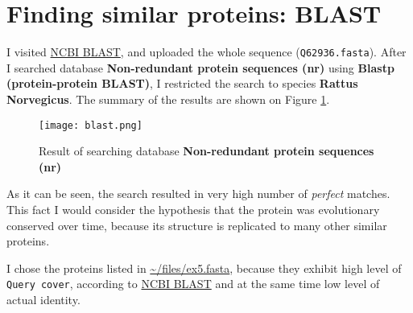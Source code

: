 \section{Finding similar proteins: BLAST}

I visited \href{https://blast.ncbi.nlm.nih.gov/Blast.cgi?PAGE=Proteins&PROGRAM=blastp&BLAST_PROGRAMS=blastp&PAGE_TYPE=BlastSearch&BLAST_SPEC=blast2seq&DATABASE=n/a&QUERY=&SUBJECTS=}{NCBI BLAST}, and uploaded the whole sequence (\texttt{Q62936.fasta}). After I searched database \textbf{Non-redundant protein sequences (nr)} using \textbf{Blastp (protein-protein BLAST)}, I restricted the search to species \textbf{Rattus Norvegicus}. The summary of the results are shown on Figure \ref{blastsum}.

\begin{figure}
\centering
\texttt{[image: blast.png]}
\caption{Result of searching database \textbf{Non-redundant protein sequences (nr)}}
\label{blastsum}
\end{figure}

As it can be seen, the search resulted in very high number of \emph{perfect} matches. This fact I would consider the hypothesis that the protein was evolutionary conserved over time, because its structure is replicated to many other similar proteins.

I chose the proteins listed in \url{~/files/ex5.fasta}, because they exhibit high level of \texttt{Query cover}, according to \href{https://blast.ncbi.nlm.nih.gov/Blast.cgi}{NCBI BLAST} and at the same time low level of actual identity.